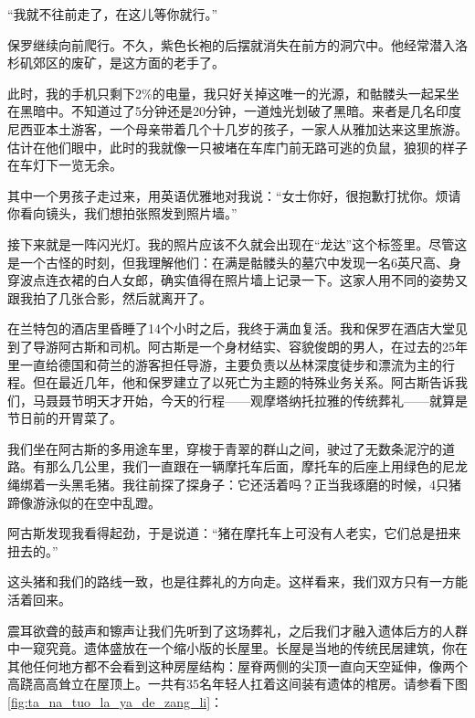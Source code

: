 \documentclass[12pt,oneside]{book}
\begin{document}
\begin{bookref}[frametitle={\cite{好好告别：世界葬礼观察手记}}]
“我就不往前走了，在这儿等你就行。”

保罗继续向前爬行。不久，紫色长袍的后摆就消失在前方的洞穴中。他经常潜入洛杉矶郊区的废矿，是这方面的老手了。

此时，我的手机只剩下2\%的电量，我只好关掉这唯一的光源，和骷髅头一起呆坐在黑暗中。不知道过了5分钟还是20分钟，一道烛光划破了黑暗。来者是几名印度尼西亚本土游客，一个母亲带着几个十几岁的孩子，一家人从雅加达来这里旅游。估计在他们眼中，此时的我就像一只被堵在车库门前无路可逃的负鼠，狼狈的样子在车灯下一览无余。

其中一个男孩子走过来，用英语优雅地对我说：“女士你好，很抱歉打扰你。烦请你看向镜头，我们想拍张照发到照片墙。”

接下来就是一阵闪光灯。我的照片应该不久就会出现在“龙达”这个标签里。尽管这是一个古怪的时刻，但我理解他们：在满是骷髅头的墓穴中发现一名6英尺高、身穿波点连衣裙的白人女郎，确实值得在照片墙上记录一下。这家人用不同的姿势又跟我拍了几张合影，然后就离开了。

在兰特包的酒店里昏睡了14个小时之后，我终于满血复活。我和保罗在酒店大堂见到了导游阿古斯和司机。阿古斯是一个身材结实、容貌俊朗的男人，在过去的25年里一直给德国和荷兰的游客担任导游，主要负责以丛林深度徒步和漂流为主的行程。但在最近几年，他和保罗建立了以死亡为主题的特殊业务关系。阿古斯告诉我们，马聂聂节明天才开始，今天的行程——观摩塔纳托拉雅的传统葬礼——就算是节日前的开胃菜了。

我们坐在阿古斯的多用途车里，穿梭于青翠的群山之间，驶过了无数条泥泞的道路。有那么几公里，我们一直跟在一辆摩托车后面，摩托车的后座上用绿色的尼龙绳绑着一头黑毛猪。我往前探了探身子：它还活着吗？正当我琢磨的时候，4只猪蹄像游泳似的在空中乱蹬。

阿古斯发现我看得起劲，于是说道：“猪在摩托车上可没有人老实，它们总是扭来扭去的。”

这头猪和我们的路线一致，也是往葬礼的方向走。这样看来，我们双方只有一方能活着回来。

震耳欲聋的鼓声和镲声让我们先听到了这场葬礼，之后我们才融入遗体后方的人群中一窥究竟。遗体盛放在一个缩小版的长屋里。长屋是当地的传统民居建筑，你在其他任何地方都不会看到这种房屋结构：屋脊两侧的尖顶一直向天空延伸，像两个高跷高高耸立在屋顶上。一共有35名年轻人扛着这间装有遗体的棺房。请参看下图\ref{fig:ta_na_tuo_la_ya_de_zang_li}：


\end{bookref}
\end{document}
